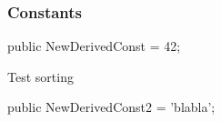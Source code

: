 \documentclass{report}
\newif\ifpdf
\begin{document}
\subsubsection*{\large{\textbf{Constants}}\normalsize\hspace{1ex}\hfill}
\begin{list}{}{
\setlength{\itemindent}{0cm}
\setlength{\listparindent}{0cm}
\setlength{\leftmargin}{\evensidemargin}
\addtolength{\leftmargin}{\tmplength}
\settowidth{\labelsep}{X}
\addtolength{\leftmargin}{\labelsep}
\setlength{\labelwidth}{\tmplength}
}
\label{ok_inherited_members.TNewDerived-NewDerivedConst}
\item[\textbf{NewDerivedConst}\hfill]
\ifpdf
\begin{flushleft}
\fi
\begin{ttfamily}
public NewDerivedConst = 42;\end{ttfamily}

\ifpdf
\end{flushleft}
\fi


\par Test sorting\label{ok_inherited_members.TNewDerived-NewDerivedConst2}
\item[\textbf{NewDerivedConst2}\hfill]
\ifpdf
\begin{flushleft}
\fi
\begin{ttfamily}
public NewDerivedConst2 = 'blabla';\end{ttfamily}

\ifpdf
\end{flushleft}
\fi


\par  \end{list}
\end{document}
